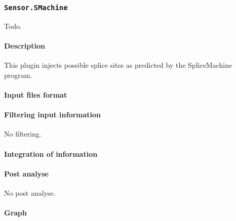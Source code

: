 
\subsubsection{\texttt{Sensor.SMachine}}

Todo.

\paragraph{Description}

This plugin injects possible splice sites as predicted by the
SpliceMachine program. 

\paragraph{Input files format}


\paragraph{Filtering input information}

No filtering.

\paragraph{Integration of information}

\paragraph{Post analyse}

No post analyse.

\paragraph{Graph}




